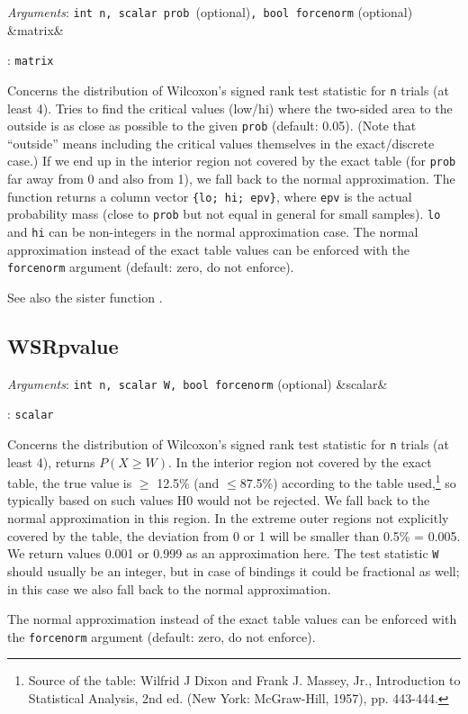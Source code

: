 \documentclass[11pt,english]{article}
\newcommand{\ArgRet}[2]{%
  {\it Arguments}: {#1}%
  \ifx&#2&%
  \else
  \par\smallskip\noindent {\it Return type}: \texttt{#2}
  \fi%
  \par\medskip\par%
  }
\begin{document}
\ArgRet{\texttt{int n, scalar prob }(optional)\texttt{, bool forcenorm}
(optional)}{matrix}


Concerns the distribution of Wilcoxon's signed rank test statistic for
\texttt{n} trials (at least 4). Tries to find the critical values
(low/hi) where the two-sided area to the outside is as close as
possible to the given \texttt{prob} (default: 0.05). (Note that
``outside'' means including the critical values themselves in the
exact/discrete case.) If we end up in the interior region not covered
by the exact table (for \texttt{prob} far away from 0 and also from
1), we fall back to the normal approximation. The function returns a
column vector \verb|{lo; hi; epv}|, where \texttt{epv} is the actual
probability mass (close to \texttt{prob} but not equal in general for
small samples). \texttt{lo} and \texttt{hi} can be non-integers in the normal
approximation case. The normal approximation instead of the exact
table values can be enforced with the \texttt{forcenorm} argument
(default: zero, do not enforce).

See also the sister function .

\subsection{WSRpvalue}

\ArgRet{\texttt{int n, scalar W, bool forcenorm} (optional)}{scalar}

Concerns the distribution of Wilcoxon's signed rank test statistic for
\texttt{n} trials (at least 4), returns $P(X\geq W)$. In the interior
region not covered by the exact table, the true value is $\geq$ 12.5\%
(and $\leq$87.5\%) according to the table used,\footnote{Source of the
  table: Wilfrid J Dixon and Frank J. Massey, Jr., Introduction to
  Statistical Analysis, 2nd ed. (New York: McGraw-Hill, 1957), pp.
  443-444.} so typically based on such values H0 would not be
rejected. We fall back to the normal approximation in this region. In
the extreme outer regions not explicitly covered by the table, the
deviation from 0 or 1 will be smaller than 0.5\% = 0.005. We return
values 0.001 or 0.999 as an approximation here. The test statistic
\texttt{W} should usually be an integer, but in case of bindings it
could be fractional as well; in this case we also fall back to the
normal approximation.

The normal approximation instead of the exact table values can be
enforced with the \texttt{forcenorm} argument (default: zero, do not
enforce).
\end{document}
